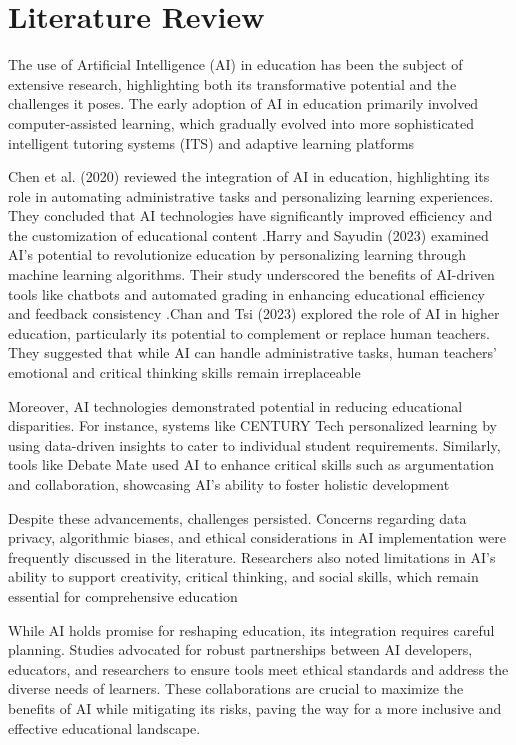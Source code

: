 \documentclass[conference]{IEEEtran}
\begin{document}
\section{Literature Review}
The use of Artificial Intelligence (AI) in education has been the subject of extensive research, highlighting both its transformative potential and the challenges it poses. The early adoption of AI in education primarily involved computer-assisted learning, which gradually evolved into more sophisticated intelligent tutoring systems (ITS) and adaptive learning platforms\cite{r1} \cite{r2}

Chen et al. (2020) reviewed the integration of AI in education, highlighting its role in automating administrative tasks and personalizing learning experiences. They concluded that AI technologies have significantly improved efficiency and the customization of educational content \cite{r1}.Harry and Sayudin (2023) examined AI's potential to revolutionize education by personalizing learning through machine learning algorithms. Their study underscored the benefits of AI-driven tools like chatbots and automated grading in enhancing educational efficiency and feedback consistency \cite{r2}.Chan and Tsi (2023) explored the role of AI in higher education, particularly its potential to complement or replace human teachers. They suggested that while AI can handle administrative tasks, human teachers' emotional and critical thinking skills remain irreplaceable \cite{r7}


Moreover, AI technologies demonstrated potential in reducing educational disparities. For instance, systems like CENTURY Tech personalized learning by using data-driven insights to cater to individual student requirements. Similarly, tools like Debate Mate used AI to enhance critical skills such as argumentation and collaboration, showcasing AI's ability to foster holistic development \cite{r8} \cite{r10}

Despite these advancements, challenges persisted. Concerns regarding data privacy, algorithmic biases, and ethical considerations in AI implementation were frequently discussed in the literature. Researchers also noted limitations in AI’s ability to support creativity, critical thinking, and social skills, which remain essential for comprehensive education \cite{r3} \cite{r9}

While AI holds promise for reshaping education, its integration requires careful planning. Studies advocated for robust partnerships between AI developers, educators, and researchers to ensure tools meet ethical standards and address the diverse needs of learners. These collaborations are crucial to maximize the benefits of AI while mitigating its risks, paving the way for a more inclusive and effective educational landscape.
\end{document}

